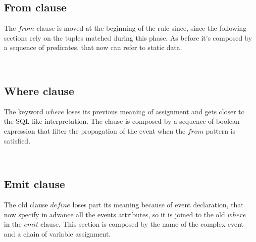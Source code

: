 \subsection{From clause}
The $from$ clause is moved at the beginning of the rule since, since the following sections rely on the tuples matched during this phase. As before it's composed by a sequence of predicates, that now can refer to static data.
\begin{bnf*}
\end{bnf*}
\begin{bnf*}
\\
\end{bnf*}

\subsection{Where clause}
The keyword $where$ loses its previous meaning of assignment and gets closer to the SQL-like interpretation. The clause is composed by a sequence of boolean expression that filter the propagation of the event when the $from$ pattern is satisfied.
\begin{bnf*}
\end{bnf*}
\begin{bnf*}
\\
\end{bnf*}

\subsection{Emit clause}
The old clause $define$ loses part its meaning because of event declaration, that now specify in advance all the events attributes, so it is joined to the old $where$ in the $emit$ clause. This section is composed by the name of the complex event and a chain of variable assignment.
\begin{bnf*}
\end{bnf*}
\begin{bnf*}
\\
\\
\end{bnf*}

